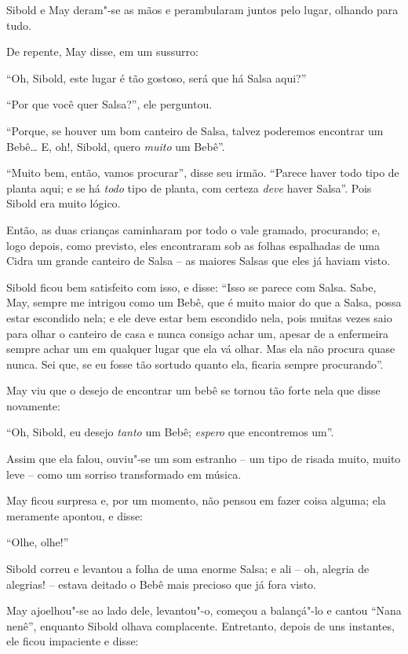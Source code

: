 Sibold e May deram"-se as mãos e perambularam juntos pelo lugar, olhando
para tudo.

De repente, May disse, em um sussurro:

``Oh, Sibold, este lugar é tão gostoso, será que há Salsa aqui?''

``Por que você quer Salsa?'', ele perguntou.

``Porque, se houver um bom canteiro de Salsa, talvez poderemos encontrar
um Bebê… E, oh!, Sibold, quero \emph{muito} um Bebê''.

``Muito bem, então, vamos procurar'', disse seu irmão. ``Parece haver
todo tipo de planta aqui; e se há \emph{todo} tipo de planta, com
certeza \emph{deve} haver Salsa''. Pois Sibold era muito lógico.

Então, as duas crianças caminharam por todo o vale gramado, procurando;
e, logo depois, como previsto, eles encontraram sob as folhas espalhadas
de uma Cidra um grande canteiro de Salsa -- as maiores Salsas que eles
já haviam visto.

Sibold ficou bem satisfeito com isso, e disse: ``Isso se parece com
Salsa. Sabe, May, sempre me intrigou como um Bebê, que é muito maior do
que a Salsa, possa estar escondido nela; e ele deve estar bem escondido
nela, pois muitas vezes saio para olhar o canteiro de casa e nunca
consigo achar um, apesar de a enfermeira sempre achar um em qualquer
lugar que ela vá olhar. Mas ela não procura quase nunca. Sei que, se eu
fosse tão sortudo quanto ela, ficaria sempre procurando''.

May viu que o desejo de encontrar um bebê se tornou tão forte nela que
disse novamente:

``Oh, Sibold, eu desejo \emph{tanto} um Bebê; \emph{espero} que
encontremos um''.

Assim que ela falou, ouviu"-se um som estranho -- um tipo de risada
muito, muito leve -- como um sorriso transformado em música.

May ficou surpresa e, por um momento, não pensou em fazer coisa alguma;
ela meramente apontou, e disse:

``Olhe, olhe!''

Sibold correu e levantou a folha de uma enorme Salsa; e ali -- oh,
alegria de alegrias! -- estava deitado o Bebê mais precioso que já fora
visto.

May ajoelhou"-se ao lado dele, levantou"-o, começou a balançá"-lo e cantou
``Nana nenê'', enquanto Sibold olhava complacente. Entretanto, depois de
uns instantes, ele ficou impaciente e disse:

